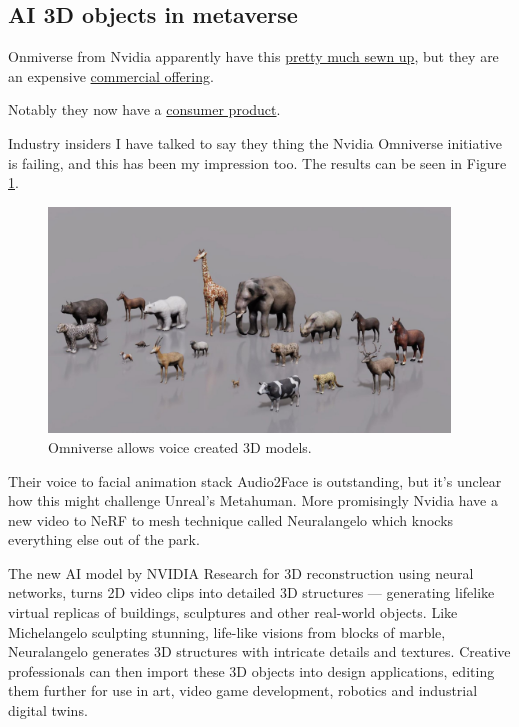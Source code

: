 \subsection{AI 3D objects in metaverse}
Onmiverse from Nvidia apparently have this \href{https://www.nvidia.com/en-us/gpu-cloud/picasso/}{pretty much sewn up}, but they are an expensive \href{https://developer.nvidia.com/blog/rapidly-generate-3d-assets-for-virtual-worlds-with-generative-ai/}{commercial offering}. \par
Notably they now have a \href{https://blogs.nvidia.com/blog/2023/06/27/magiscan-app-augmented-reality-openusd/?}{consumer product}. \par
Industry insiders I have talked to say they thing the Nvidia Omniverse initiative is failing, and this has been my impression too. The results can be seen in Figure \ref{fig:nvidiavoice}.
\begin{figure}[H]
    \centering
    \includegraphics[width=0.95\textwidth]{images/nvidiavoice}
    \caption{Omniverse allows voice created 3D models.}
    \label{fig:nvidiavoice}
\end{figure}
Their voice to facial animation stack Audio2Face is outstanding, but it's unclear how this might challenge Unreal's Metahuman. More promisingly Nvidia have a new video to NeRF to mesh technique called Neuralangelo \cite{li2023neuralangelo} which knocks everything else out of the park. 
\begin{tcolorbox}[enhanced, frame style={fill=lightgray}, interior style={fill=lightgray}]The new AI model by NVIDIA Research for 3D reconstruction using neural networks, turns 2D video clips into detailed 3D structures — generating lifelike virtual replicas of buildings, sculptures and other real-world objects. Like Michelangelo sculpting stunning, life-like visions from blocks of marble, Neuralangelo generates 3D structures with intricate details and textures. Creative professionals can then import these 3D objects into design applications, editing them further for use in art, video game development, robotics and industrial digital twins.
\end{tcolorbox}
